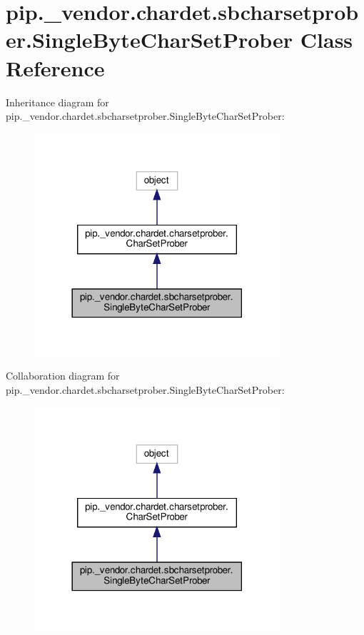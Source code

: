 \hypertarget{classpip_1_1__vendor_1_1chardet_1_1sbcharsetprober_1_1SingleByteCharSetProber}{}\section{pip.\+\_\+vendor.\+chardet.\+sbcharsetprober.\+Single\+Byte\+Char\+Set\+Prober Class Reference}
\label{classpip_1_1__vendor_1_1chardet_1_1sbcharsetprober_1_1SingleByteCharSetProber}


Inheritance diagram for pip.\+\_\+vendor.\+chardet.\+sbcharsetprober.\+Single\+Byte\+Char\+Set\+Prober\+:
\nopagebreak
\begin{figure}[H]
\begin{center}
\leavevmode
\includegraphics[width=258pt]{classpip_1_1__vendor_1_1chardet_1_1sbcharsetprober_1_1SingleByteCharSetProber__inherit__graph}
\end{center}
\end{figure}


Collaboration diagram for pip.\+\_\+vendor.\+chardet.\+sbcharsetprober.\+Single\+Byte\+Char\+Set\+Prober\+:
\nopagebreak
\begin{figure}[H]
\begin{center}
\leavevmode
\includegraphics[width=258pt]{classpip_1_1__vendor_1_1chardet_1_1sbcharsetprober_1_1SingleByteCharSetProber__coll__graph}
\end{center}
\end{figure}
